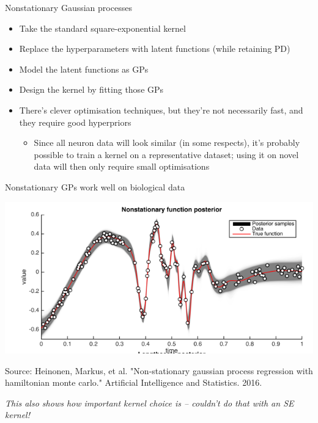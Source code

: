 \documentclass[presentation]{beamer}
\begin{document}
\begin{frame}[label={sec:org7612fc3}]{Nonstationary Gaussian processes}
\begin{itemize}
\item Take the standard square-exponential kernel
\item Replace the hyperparameters with latent functions (while retaining PD)
\item Model the latent functions as GPs
\item Design the kernel by fitting those GPs
\item There's clever optimisation techniques, \alert{but they're not necessarily fast, and they require good hyperpriors}
\begin{itemize}
\item Since all neuron data will look similar (in some respects), it's probably possible to train a kernel on a representative dataset; using it on novel data will then only require small optimisations
\end{itemize}
\end{itemize}
\end{frame}

\begin{frame}[plain,label={sec:orgddc51b3}]{Nonstationary GPs work well on biological data}
\begin{center}
\includegraphics[width=.9\linewidth]{./nonstationary.png}
\end{center}

Source: Heinonen, Markus, et al. "Non-stationary gaussian process regression with hamiltonian monte carlo." Artificial Intelligence and Statistics. 2016.

\vfill

\emph{This also shows how important kernel choice is -- couldn't do that with an SE kernel!}
\end{frame}
\end{document}
